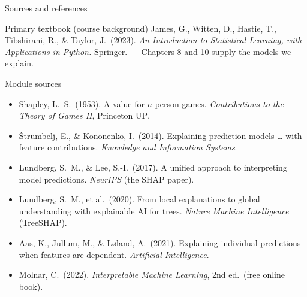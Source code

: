 \documentclass[aspectratio=169,11pt]{beamer}
\begin{document}
\begin{frame}{Sources and references}
  \begin{block}{Primary textbook (course background)}
    James, G., Witten, D., Hastie, T., Tibshirani, R., \& Taylor, J.\ (2023).
    \emph{An Introduction to Statistical Learning, with Applications in
    Python.} Springer. --- Chapters 8 and 10 supply the models we explain.
  \end{block}
  \begin{block}{Module sources}
    \footnotesize
    \begin{itemize}
      \item Shapley, L.\ S.\ (1953). A value for $n$-person games. \emph{Contributions to the Theory of Games II}, Princeton UP.
      \item \v{S}trumbelj, E., \& Kononenko, I.\ (2014). Explaining prediction models \dots{} with feature contributions. \emph{Knowledge and Information Systems}.
      \item Lundberg, S.\ M., \& Lee, S.-I.\ (2017). A unified approach to interpreting model predictions. \emph{NeurIPS} (the SHAP paper).
      \item Lundberg, S.\ M., et al.\ (2020). From local explanations to global understanding with explainable AI for trees. \emph{Nature Machine Intelligence} (TreeSHAP).
      \item Aas, K., Jullum, M., \& L{\o}land, A.\ (2021). Explaining individual predictions when features are dependent. \emph{Artificial Intelligence}.
      \item Molnar, C.\ (2022). \emph{Interpretable Machine Learning}, 2nd ed.\ (free online book).
    \end{itemize}
  \end{block}
\end{frame}
\end{document}
